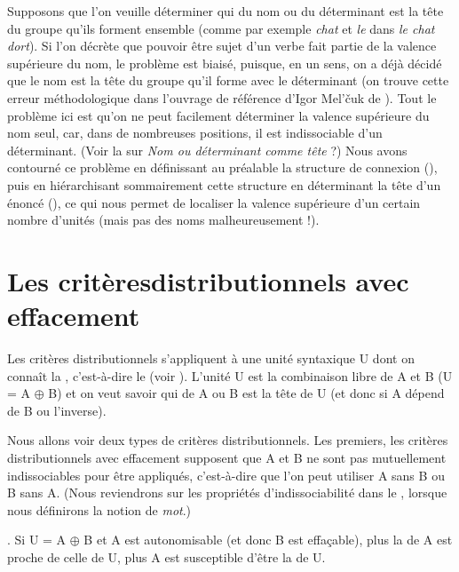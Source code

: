 Supposons que l’on veuille déterminer qui du nom ou du déterminant est la tête du groupe qu’ils forment ensemble (comme par exemple \textit{chat} et \textit{le} dans \textit{le chat dort}). Si l’on décrète que pouvoir être sujet d’un verbe fait partie de la valence supérieure du nom, le problème est biaisé, puisque, en un sens, on a déjà décidé que le nom est la tête du groupe qu’il forme avec le déterminant (on trouve cette erreur méthodologique dans l’ouvrage de référence d’Igor Mel’čuk de \citeyear{melcuk1988dependency}). Tout le problème ici est qu’on ne peut facilement déterminer la valence supérieure du nom seul, car, dans de nombreuses positions, il est indissociable d’un déterminant. (Voir la  sur \textit{Nom ou déterminant comme tête} ?) Nous avons contourné ce problème en définissant au préalable la structure de connexion (), puis en hiérarchisant sommairement cette structure en déterminant la tête d’un énoncé (), ce qui nous permet de localiser la valence supérieure d’un certain nombre d’unités (mais pas des noms malheureusement !).

\section{Les critèresdistributionnels avec effacement}\label{sec:3.3.11}

Les critères distributionnels s’appliquent à une unité syntaxique U dont on connaît la , c’est-à-dire le  (voir ).
L'unité U est la combinaison libre de A et B (U = A ${\oplus}$ B) et on veut savoir qui de A ou B est la tête de U (et donc si A dépend de B ou l'inverse).

Nous allons voir deux types de critères distributionnels. Les premiers, les critères distributionnels avec effacement supposent que A et B ne sont pas mutuellement indissociables pour être appliqués, c'est-à-dire que l'on peut utiliser A sans B ou B sans A. (Nous reviendrons sur les propriétés d'indissociabilité dans le  , lorsque nous définirons la notion de \textit{mot}.)

{. Si U = A ${\oplus}$ B et A est autonomisable (et donc B est effaçable), plus la   de A est proche de celle de U, plus A est susceptible d'être la  de U.}

